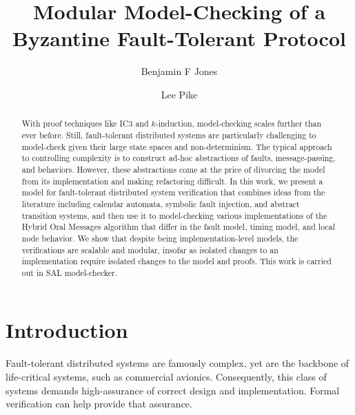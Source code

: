 \documentclass{llncs/llncs}
\begin{document}
\title{Modular Model-Checking of a Byzantine Fault-Tolerant Protocol}

\author{Benjamin F Jones \and Lee Pike}


\maketitle

\begin{abstract}
With proof techniques like IC3 and $k$-induction, model-checking scales further
than ever before. Still, fault-tolerant distributed systems are particularly
challenging to model-check given their large state spaces and
non-determinism. The typical approach to controlling complexity is to construct
ad-hoc abstractions of faults, message-passing, and behaviors. However, these
abstractions come at the price of divorcing the model from its implementation
and making refactoring difficult. In this work, we present a model for
fault-tolerant distributed system verification that combines ideas from the
literature including calendar automata, symbolic fault injection, and abstract
transition systems, and then use it to model-checking various implementations of
the Hybrid Oral Messages algorithm that differ in the fault model, timing model,
and local node behavior. We show that despite being implementation-level models,
the verifications are scalable and modular, insofar as isolated changes to an
implementation require isolated changes to the model and proofs. This work is
carried out in SAL model-checker.
\end{abstract}

\section{Introduction}

Fault-tolerant distributed systems are famously complex, yet are the backbone of life-critical systems, such as commercial avionics. Consequently, this class of systems demands high-assurance of correct design and implementation. Formal verification can help provide that assurance.
\end{document}
